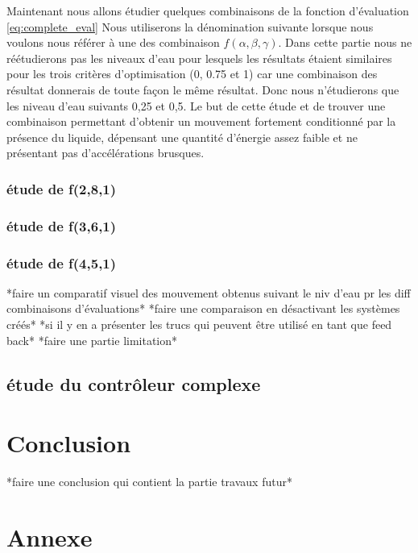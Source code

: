 \documentclass[runningheads,a4paper]{llncs}
\begin{document}
Maintenant nous allons étudier quelques combinaisons de la fonction d'évaluation \ref{eq:complete_eval}  Nous utiliserons la dénomination suivante lorsque nous voulons nous référer à une des combinaison $f(\alpha,\beta,\gamma)$. Dans cette partie nous ne réétudierons pas les niveaux d'eau pour lesquels les résultats étaient similaires pour les trois critères d'optimisation (0, 0.75 et 1) car une combinaison des résultat donnerais de toute façon le même résultat. Donc nous n'étudierons que les niveau d'eau suivants 0,25 et 0,5. Le but de cette étude et de trouver une combinaison permettant d'obtenir un mouvement fortement conditionné par la présence du liquide, dépensant une quantité d'énergie assez faible et ne présentant pas d'accélérations brusques.

\subsubsection{étude de f(2,8,1)}

\subsubsection{étude de f(3,6,1)}

\subsubsection{étude de f(4,5,1)}

*faire un comparatif visuel des mouvement obtenus suivant le niv d'eau pr les diff combinaisons d'évaluations*
*faire une comparaison en désactivant les systèmes créés*
*si il y en a présenter les trucs qui peuvent être utilisé en tant que feed back*
*faire une partie limitation*

\subsection{étude du contrôleur complexe}

\section{Conclusion}
%
*faire une conclusion qui contient la partie travaux futur*
%



%
\nocite{*}


%
\newpage
\section{Annexe}
\end{document}
